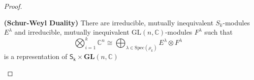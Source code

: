 \documentclass[12pt]{article}
\newcommand{\C}{\mathbb{C}}
\newenvironment{corollary}[2][Corollary]{\begin{trivlist}
\item[\hskip \labelsep {\bfseries #1}\hskip \labelsep {\bfseries #2.}]}{\end{trivlist}}
\begin{document}
\begin{proof}
\begin{corollary}{8.2}
    \textbf{(Schur-Weyl Duality)} There are irreducible, mutually inequivalent $S_k$-modules $E^\lambda$ and irreducible, mutually inequivalent $\mathrm{GL}(n, \mathbb{C})$-modules $F^\lambda$ such that
    $$
    \bigotimes_{i=1}^k\C^n \cong \bigoplus_{\lambda \in \mathrm{Spec}(\rho_k)}E^{\lambda}\otimes F^{\lambda}
    $$
    is a representation of $\mathsf{S_k} \times \mathbf{GL}(n,\C)$
\end{corollary}
\end{proof}

  
\end{document}
